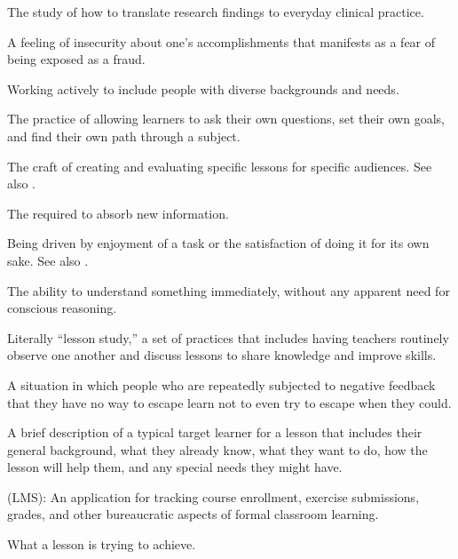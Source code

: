 \begin{description}
 The study of how to
translate research findings to everyday clinical practice.

 A feeling of insecurity about
one's accomplishments that manifests as a fear of being exposed as a fraud.

 Working actively to include people with
diverse backgrounds and needs.

 The practice of
allowing learners to ask their own questions, set their own goals, and find
their own path through a subject.

 The craft of creating and
evaluating specific lessons for specific audiences. See also
.

 The 
required to absorb new information.

 Being driven by enjoyment
of a task or the satisfaction of doing it for its own sake.  See also
.

 The ability to understand something immediately,
without any apparent need for conscious reasoning.

 Literally ``lesson study,'' a set of
practices that includes having teachers routinely observe one another and
discuss lessons to share knowledge and improve skills.

 A situation in which
people who are repeatedly subjected to negative feedback that they have no way
to escape learn not to even try to escape when they could.

 A brief description of a typical
target learner for a lesson that includes their general background, what they
already know, what they want to do, how the lesson will help them, and any
special needs they might have.

 (LMS): An application for tracking course
enrollment, exercise submissions, grades, and other bureaucratic aspects of
formal classroom learning.

 What a lesson is trying to
achieve.


\end{description}
